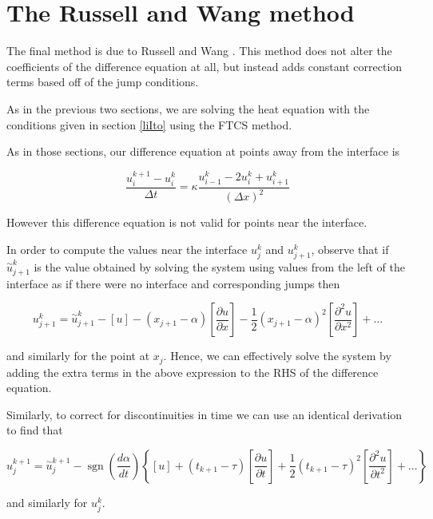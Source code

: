 \section{The Russell and Wang method}

The final method is due to Russell and Wang \cite{russellwang03}.
This method does not alter the coefficients of the difference equation at all, but instead adds constant correction terms based off of the jump conditions.

As in the previous two sections, we are solving the heat equation with the conditions given in section \ref{liIto} using the FTCS method.

As in those sections, our difference equation at points away from the interface is

\begin{equation}
    \frac{u_i^{k+1} - u_i^k}{\Delta t} = \kappa \frac{u_{i-1}^k - 2 u_i^k + u_{i+1}^k}{(\Delta x)^2}
\end{equation}

However this difference equation is not valid for points near the interface.

In order to compute the values near the interface $u_j^k$ and $u_{j+1}^k$, observe that if $\overset{\sim}{u}_{j+1}^k$ is the value obtained by solving the system using values from the left of the interface as if there were no interface and corresponding jumps then

\begin{equation}
    u_{j+1}^k = \overset{\sim}{u}_{j+1}^k - [u] - (x_{j+1} - \alpha)\left[\frac{\partial u}{\partial x}\right] - \frac{1}{2}(x_{j+1} - \alpha)^2\left[\frac{\partial^2 u}{\partial x^2}\right] + \ldots
\end{equation}

and similarly for the point at $x_j$.
Hence, we can effectively solve the system by adding the extra terms in the above expression to the RHS of the difference equation.

Similarly, to correct for discontinuities in time we can use an identical derivation to find that

\begin{equation}
    u_j^{k+1} = \overset{\sim}{u}_j^{k+1} - \operatorname{sgn}\left(\frac{d \alpha}{d t}\right)\left\{[u] + (t_{k+1} - \tau)\left[\frac{\partial u}{\partial t}\right] + \frac{1}{2}(t_{k+1} - \tau)^2 \left[\frac{\partial^2 u}{\partial t^2}\right] + \ldots \right\}
\end{equation}

and similarly for $u_j^k$.
